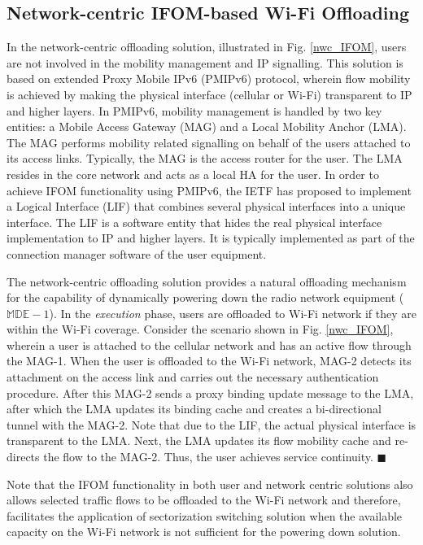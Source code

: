 \documentclass[journal]{IEEEtran}
\begin{document}
\subsection{Network-centric IFOM-based Wi-Fi Offloading}
In the network-centric offloading solution, illustrated in Fig. \ref{nwc_IFOM}, users are not involved in the mobility management and IP signalling. This solution is based on extended Proxy Mobile IPv6 (PMIPv6) \cite{rfc5213} protocol, wherein flow mobility is achieved by making the physical interface (cellular or Wi-Fi) transparent to IP and higher layers. In PMIPv6, mobility management is handled by two key entities: a Mobile Access Gateway (MAG) and a Local Mobility Anchor (LMA). The MAG performs mobility related signalling on behalf of the users attached to its access links. Typically, the MAG is the access router for the user. The LMA resides in the core network and acts as a local HA for the user. In order to achieve IFOM functionality using PMIPv6, the IETF has proposed to implement a Logical Interface (LIF) that combines several physical interfaces into a unique interface. The LIF is a software entity that hides the real physical interface implementation to IP and higher layers. It is typically implemented as part of the connection manager software of the user equipment. 



The network-centric offloading solution provides a natural offloading mechanism for the capability of dynamically powering down the radio network equipment ($\mathbb{MDE}-1$). In the \emph{execution} phase, users are offloaded to Wi-Fi network if they are within the Wi-Fi coverage. Consider the scenario shown in Fig. \ref{nwc_IFOM}, wherein a user is attached to the cellular network and has an active flow through the MAG-1. When the user is offloaded to the Wi-Fi network, MAG-2 detects its attachment on the access link and carries out the necessary authentication procedure. After this MAG-2 sends a proxy binding update message to the LMA, after which the LMA updates its binding cache and creates a bi-directional tunnel with the MAG-2. Note that due to the LIF, the actual physical interface is transparent to the LMA. Next, the LMA updates its flow mobility cache and re-directs the flow to the MAG-2. Thus, the user achieves service continuity. $\blacksquare$



Note that the IFOM functionality in both user and network centric solutions also allows selected traffic flows to be offloaded to the Wi-Fi network and therefore, facilitates the application of sectorization switching solution when the available capacity on the Wi-Fi network is not sufficient for the powering down solution. 
\end{document}
